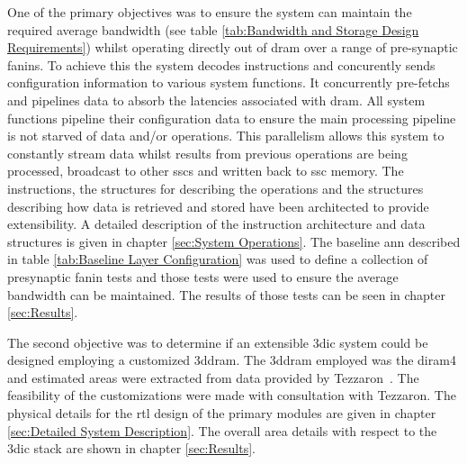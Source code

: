 One of the primary objectives was to ensure the system can maintain the required average bandwidth (see table \ref{tab:Bandwidth and Storage Design Requirements}) whilst operating directly out of \ac{dram} over a range of pre-synaptic fanins.
To achieve this the system decodes instructions and concurently sends configuration information to various system functions.
It concurrently pre-fetchs and pipelines data to absorb the latencies associated with \ac{dram}.
All system functions pipeline their configuration data to ensure the main processing pipeline is not starved of data and/or operations.
This parallelism allows this system to constantly stream data whilst results from previous operations are being processed, broadcast to other \acp{ssc} and written back to \ac{ssc} memory.
The instructions, the structures for describing the operations and the structures describing how data is retrieved and stored have been architected to provide extensibility.
A detailed description of the instruction architecture and data structures is given in chapter \ref{sec:System Operations}.
The baseline \ac{ann} described in table \ref{tab:Baseline Layer Configuration} was used to define a collection of presynaptic fanin tests and those tests were used to ensure the average bandwidth can be maintained.
The results of those tests can be seen in chapter \ref{sec:Results}.


The second objective was to determine if an extensible \ac{3dic} system could be designed employing a customized \ac{3ddram}.
The \ac{3ddram} employed was the \ac{diram4} and estimated areas were extracted from data provided by Tezzaron\textregistered~\cite{patti2014}.
The feasibility of the customizations were made with consultation with Tezzaron\textregistered.
The physical details for the \ac{rtl} design of the primary modules are given in chapter \ref{sec:Detailed System Description}.
The overall area details with respect to the \ac{3dic} stack are shown in chapter \ref{sec:Results}.



